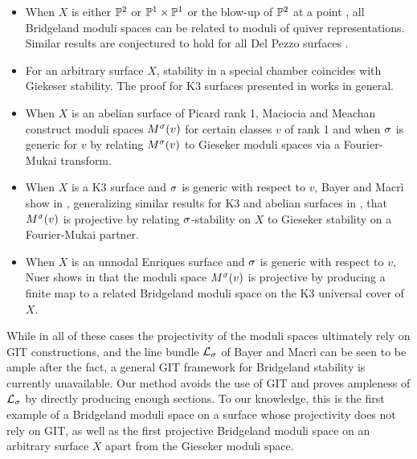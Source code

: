 \begin{itemize}
    \item When $X$ is either $\mathbb{P}^2$ \cite{ABCH} or $\mathbb{P}^1 \times \mathbb{P}^1$ or the blow-up of $\mathbb{P}^2$ at a point \cite{AM}, all Bridgeland moduli spaces can be related to moduli of quiver representations. Similar results are conjectured to hold for all Del Pezzo surfaces \cite{AM}.
    
    \item For an arbitrary surface $X$, stability in a special chamber coincides with Giekeser stability. The proof for K3 surfaces presented in \cite{bridgelandK3} works in general.
    
    
    \item When $X$ is an abelian surface of Picard rank 1, Maciocia and Meachan \cite{MM} construct moduli spaces $M^\sigma(v)$ for certain classes $v$ of rank 1 and when $\sigma$ is generic for $v$ by relating $M^\sigma(v)$ to Gieseker moduli spaces via a Fourier-Mukai transform.
    
    \item When $X$ is a K3 surface and $\sigma$ is generic with respect to $v$, Bayer and Macr\`i show in \cite{BM}, generalizing similar results for K3 and abelian surfaces in \cite{mmy}, that $M^\sigma(v)$ is projective by relating $\sigma$-stability on $X$ to Gieseker stability on a Fourier-Mukai partner.
    
    \item When $X$ is an unnodal Enriques surface and $\sigma$ is generic with respect to $v$, Nuer shows in \cite{nuer} that the moduli space $M^\sigma(v)$ is projective by producing a finite map to a related Bridgeland moduli space on the K3 universal cover of $X$.
    
\end{itemize} 
While in all of these cases the projectivity of the moduli spaces ultimately rely on GIT constructions, and the line bundle $\mathcal{L}_\sigma$ of Bayer and Macr\`i can be seen to be ample after the fact, a general GIT framework for Bridgeland stability is currently unavailable. Our method avoids the use of GIT and proves ampleness of $
\mathcal{L}_\sigma$ by directly producing enough sections. To our knowledge, this is the first example of a Bridgeland moduli space on a surface whose projectivity does not rely on GIT, as well as the first projective Bridgeland moduli space on an arbitrary surface $X$ apart from the Gieseker moduli space.

